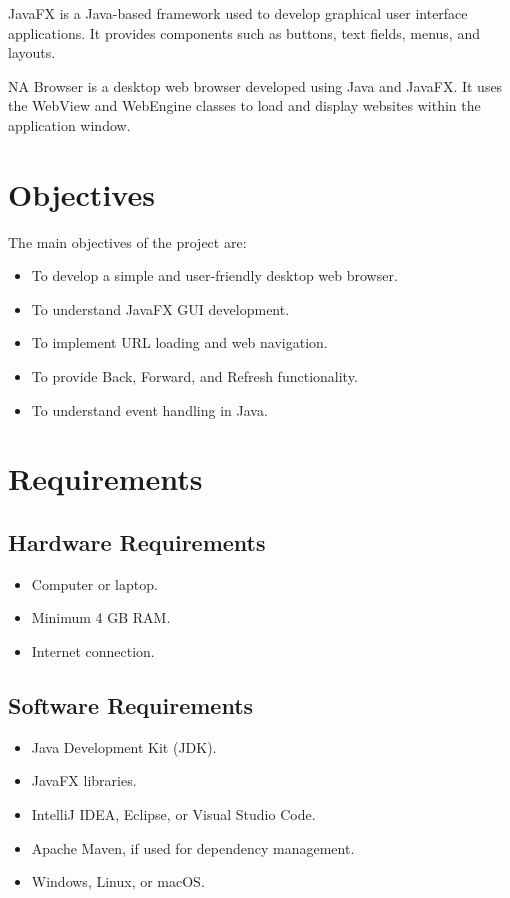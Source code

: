 \documentclass[12pt,a4paper]{report}
\begin{document}
JavaFX is a Java-based framework used to develop
graphical user interface applications. It provides
components such as buttons, text fields, menus,
and layouts.

NA Browser is a desktop web browser developed using
Java and JavaFX. It uses the WebView and WebEngine
classes to load and display websites within the
application window.

\chapter{Objectives}

The main objectives of the project are:

\begin{itemize}
    \item To develop a simple and user-friendly
    desktop web browser.
    \item To understand JavaFX GUI development.
    \item To implement URL loading and web navigation.
    \item To provide Back, Forward, and Refresh
    functionality.
    \item To understand event handling in Java.
\end{itemize}

\chapter{Requirements}

\section{Hardware Requirements}

\begin{itemize}
    \item Computer or laptop.
    \item Minimum 4 GB RAM.
    \item Internet connection.
\end{itemize}

\section{Software Requirements}

\begin{itemize}
    \item Java Development Kit (JDK).
    \item JavaFX libraries.
    \item IntelliJ IDEA, Eclipse, or Visual Studio Code.
    \item Apache Maven, if used for dependency management.
    \item Windows, Linux, or macOS.
\end{itemize}
\end{document}

